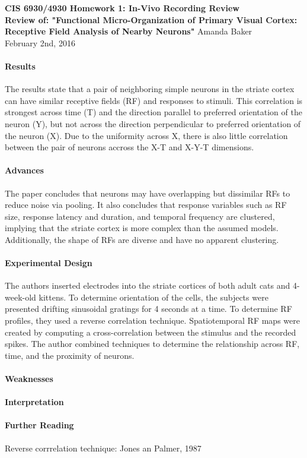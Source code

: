 \documentclass[11pt]{article}
\begin{document}
\begin{center}
{\large {\bf CIS 6930/4930 Homework 1: In-Vivo Recording Review}}\\
{\normalsize {\bf Review of: "Functional Micro-Organization of Primary Visual Cortex: Receptive
Field Analysis of Nearby Neurons"}}
Amanda Baker \\
February 2nd, 2016 \\
\end{center}

\paragraph{Results}
The results state that a pair of neighboring simple neurons in the striate cortex
can have similar receptive fields (RF) and responses to stimuli.  This correlation is
strongest across time (T) and the direction parallel to preferred orientation of
the neuron (Y), but not across the direction perpendicular to preferred orientation
of the neuron (X).  Due to the uniformity across X, there is also little correlation
between the pair of neurons accross the X-T and X-Y-T dimensions.\\

\paragraph{Advances}
The paper concludes that neurons may have overlapping but dissimilar RFs to reduce
noise via pooling. It also concludes that response variables such as RF size, response
latency and duration, and temporal frequency are clustered, implying that the striate
cortex is more complex than the assumed models.  Additionally, the shape of RFs are
diverse and have no apparent clustering. \\

\paragraph{Experimental Design}
The authors inserted electrodes into the striate cortices of both adult cats and
4-week-old kittens.  To determine orientation of the cells, the subjects were presented
drifting sinusoidal gratings for 4 seconds at a time.  To determine RF profiles,
they used a reverse correlation technique.  Spatiotemporal RF maps were created
by computing a cross-correlation between the stimulus and the recorded spikes.
The author combined techniques to determine the relationship across RF, time, and
the proximity of neurons. \\

\paragraph{Weaknesses}

\paragraph{Interpretation}

\paragraph{Further Reading}
Reverse corrrelation technique: Jones an Palmer, 1987 \\
\end{document}
